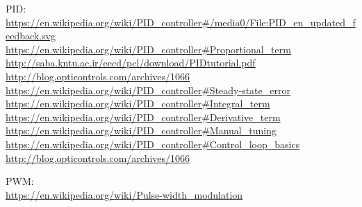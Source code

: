 PID: \\
\url{https://en.wikipedia.org/wiki/PID_controller#/media0/File:PID_en_updated_feedback.svg}\\

\url{https://en.wikipedia.org/wiki/PID_controller#Proportional_term}\\

\url{http://saba.kntu.ac.ir/eecd/pcl/download/PIDtutorial.pdf}\\

\url{http://blog.opticontrols.com/archives/1066}\\

\url{https://en.wikipedia.org/wiki/PID_controller#Steady-state_error}\\

\url{https://en.wikipedia.org/wiki/PID_controller#Integral_term}\\

\url{https://en.wikipedia.org/wiki/PID_controller#Derivative_term}\\

\url{https://en.wikipedia.org/wiki/PID_controller#Manual_tuning}\\

\url{https://en.wikipedia.org/wiki/PID_controller#Control_loop_basics}\\

\url{http://blog.opticontrols.com/archives/1066}

PWM:\\

\url{https://en.wikipedia.org/wiki/Pulse-width_modulation}\\
